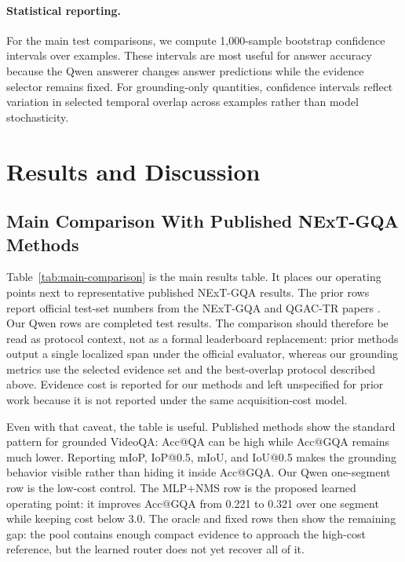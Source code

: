 \documentclass{article}
\begin{document}
\paragraph{Statistical reporting.}
For the main test comparisons, we compute 1,000-sample bootstrap confidence intervals over examples. These intervals are most useful for answer accuracy because the Qwen answerer changes answer predictions while the evidence selector remains fixed. For grounding-only quantities, confidence intervals reflect variation in selected temporal overlap across examples rather than model stochasticity.

\section{Results and Discussion}
\subsection{Main Comparison With Published NExT-GQA Methods}
Table~\ref{tab:main-comparison} is the main results table. It places our operating points next to representative published NExT-GQA results. The prior rows report official test-set numbers from the NExT-GQA and QGAC-TR papers \citep{xiao2023trust,xu2024qgac}. Our Qwen rows are completed test results. The comparison should therefore be read as protocol context, not as a formal leaderboard replacement: prior methods output a single localized span under the official evaluator, whereas our grounding metrics use the selected evidence set and the best-overlap protocol described above. Evidence cost is reported for our methods and left unspecified for prior work because it is not reported under the same acquisition-cost model.

Even with that caveat, the table is useful. Published methods show the standard pattern for grounded VideoQA: Acc@QA can be high while Acc@GQA remains much lower. Reporting mIoP, IoP@0.5, mIoU, and IoU@0.5 makes the grounding behavior visible rather than hiding it inside Acc@GQA. Our Qwen one-segment row is the low-cost control. The MLP+NMS row is the proposed learned operating point: it improves Acc@GQA from 0.221 to 0.321 over one segment while keeping cost below 3.0. The oracle and fixed rows then show the remaining gap: the pool contains enough compact evidence to approach the high-cost reference, but the learned router does not yet recover all of it.
\end{document}
